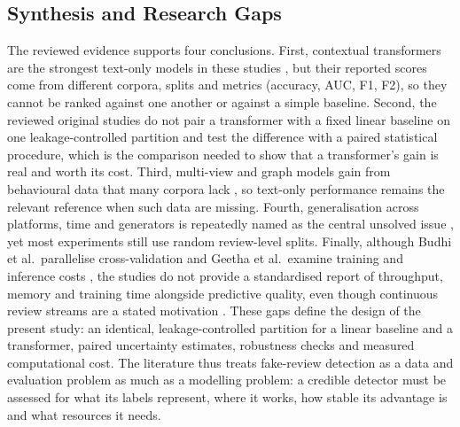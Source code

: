\subsection{Synthesis and Research Gaps}
The reviewed evidence supports four conclusions. First, contextual transformers are the strongest text-only models in these studies \cite{ref11,ref15,ref6}, but their reported scores come from different corpora, splits and metrics (accuracy, AUC, F1, F2), so they cannot be ranked against one another or against a simple baseline. Second, the reviewed original studies do not pair a transformer with a fixed linear baseline on one leakage-controlled partition and test the difference with a paired statistical procedure, which is the comparison needed to show that a transformer's gain is real and worth its cost. Third, multi-view and graph models gain from behavioural data that many corpora lack \cite{ref1,ref10,ref14,ref3}, so text-only performance remains the relevant reference when such data are missing. Fourth, generalisation across platforms, time and generators is repeatedly named as the central unsolved issue \cite{ref7,ref4,ref17}, yet most experiments still use random review-level splits. Finally, although Budhi et al.\ parallelise cross-validation \cite{ref2} and Geetha et al.\ examine training and inference costs \cite{ref6}, the studies do not provide a standardised report of throughput, memory and training time alongside predictive quality, even though continuous review streams are a stated motivation \cite{ref5}. These gaps define the design of the present study: an identical, leakage-controlled partition for a linear baseline and a transformer, paired uncertainty estimates, robustness checks and measured computational cost. The literature thus treats fake-review detection as a data and evaluation problem as much as a modelling problem: a credible detector must be assessed for what its labels represent, where it works, how stable its advantage is and what resources it needs.
